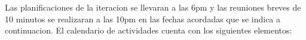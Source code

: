 \newpage
Las planificaciones de la iteracion se llevaran a las 6pm y las reuniones
breves de 10 minutos se realizaran a las 10pm en las fechas acordadas que se
indica a continuacion. El calendario de actividades cuenta con los siguientes
elementos:

\begin{figure}[h]
    \hspace{1cm}
\end{figure}

\begin{figure}[h]
\end{figure}

